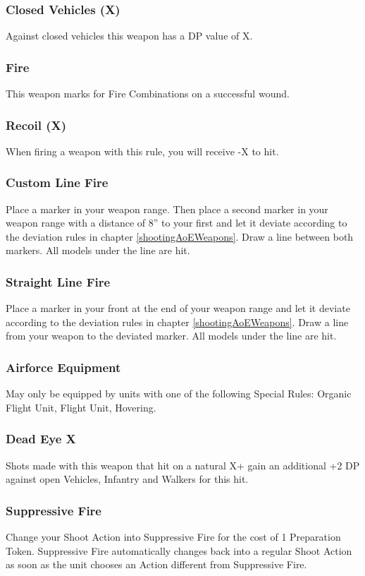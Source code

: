 \documentclass[
	11pt,
	toc=bibliography
	]{article}
\begin{document}
\subsubsection*{Closed Vehicles (X)}
Against closed vehicles this weapon has a DP value of X.

\subsubsection*{Fire}
This weapon marks for Fire Combinations on a successful wound.

\subsubsection*{Recoil (X)}
When firing a weapon with this rule, you will receive -X to hit.

\subsubsection*{Custom Line Fire}
Place a marker in your weapon range. Then place a second marker in your weapon range with a distance of 8'' to your first and let it deviate according to the deviation rules in chapter \ref{shootingAoEWeapons}. Draw a line between both markers. All models under the line are hit. 

\subsubsection*{Straight Line Fire}
Place a marker in your front at the end of your weapon range and let it deviate according to the deviation rules in chapter \ref{shootingAoEWeapons}. Draw a line from your weapon to the deviated marker. All models under the line are hit. 

\subsubsection*{Airforce Equipment}
May only be equipped by units with one of the following Special Rules: Organic Flight Unit, Flight Unit, Hovering. 

\subsubsection*{Dead Eye X}
Shots made with this weapon that hit on a natural X+ gain an additional +2 DP against open Vehicles, Infantry and Walkers for this hit.
 
\subsubsection*{Suppressive Fire}\label{suppressiveFire}
Change your Shoot Action into Suppressive Fire for the cost of 1 Preparation Token. Suppressive Fire automatically changes back into a regular Shoot Action as soon as the unit chooses an Action different from Suppressive Fire.
\end{document}
